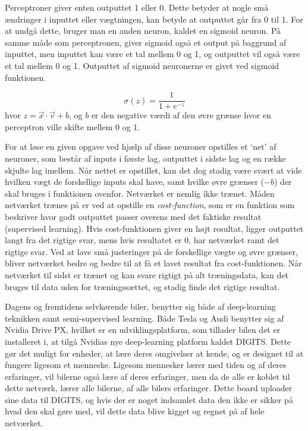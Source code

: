 Perceptroner giver enten outputtet 1 eller 0. Dette betyder at nogle små ændringer i inputtet eller vægtningen, kan betyde at outputtet går fra 0 til 1. For at undgå dette, bruger man en anden neuron, kaldet en sigmoid neuron. På samme måde som perceptronen, giver sigmoid også et output på baggrund af inputtet, men inputtet kan være et tal mellem 0 og 1, og outputtet vil også være et tal mellem 0 og 1. Outputtet af sigmoid neuronerne er givet ved sigmoid funktionen\cite{neural}.

\begin{equation}
	\sigma(z)=\frac{1}{1+e^{-z}}
\end{equation}
hvor $z=\vec{x}\cdot \vec{v} + b$, og $b$ er den negative værdi af den øvre grænse hvor en perceptron ville skifte mellem 0 og 1.

For at løse en given opgave ved hjælp af disse neuroner opstilles et `net' af neuroner, som består af inputs i første lag, outputtet i sidste lag og en række skjulte lag imellem. Når nettet er opstillet, kan det dog stadig være svært at vide hvilken vægt de forskellige inputs skal have, samt hvilke øvre grænser ($-b$) der skal bruges i funktionen ovenfor. Netværket er nemlig ikke trænet. Måden netværket trænes på er ved at opstille en \textit{cost-function}, som er en funktion som beskriver hvor godt outputtet passer overens med det faktiske resultat (supervised learning). Hvis cost-funktionen giver en højt resultat, ligger outputtet langt fra det rigtige svar, mens hvis resultatet er 0, har netværket ramt det rigtige svar. Ved at lave små justeringer på de forskellige vægte og øvre grænser, bliver netværket bedre og bedre til at få et lavet resultat fra cost-funktionen. Når netværket til sidst er trænet og kan svare rigtigt på alt træningsdata, kan det bruges til data uden for træningssættet, og stadig finde det rigtige resultat. 

Dagens og fremtidens selvkørende biler, benytter sig både af deep-learning teknikken samt semi-supervised learning\cite{Musk}. Både Tesla og Audi benytter sig af Nvidia Drive PX, hvilket er en udviklingsplatform, som tillader bilen det er installeret i, at tilgå Nvidias nye deep-learning platform kaldet DIGITS. Dette gør det muligt for enheder, at lære deres omgivelser at kende, og er designet til at fungere ligesom et menneske. Ligesom mennesker lærer med tiden og af deres erfaringer, vil bilerne også lære af deres erfaringer, men da de alle er koblet til dette netværk, lærer alle bilerne, af alle bilers erfaringer\cite{Nvidia}. Dette board uploader sine data til DIGITS, og hvis der er noget indsamlet data den ikke er sikker på hvad den skal gøre med, vil dette data blive kigget og regnet på af hele netværket.